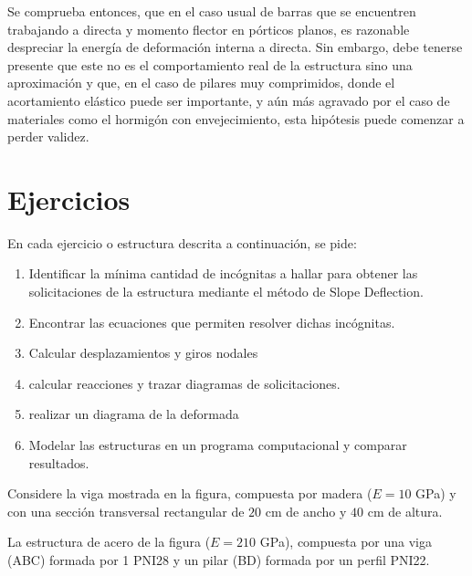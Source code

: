 Se comprueba entonces, que en el caso usual de barras que se encuentren trabajando a directa y momento flector en pórticos planos, es razonable despreciar la energía de deformación interna a directa. %
%
Sin embargo, debe tenerse presente que este no es el comportamiento real de la estructura sino una aproximación y que, en el caso de pilares muy comprimidos, donde el acortamiento elástico puede ser importante, y aún más agravado por el caso de materiales como el hormigón con envejecimiento, esta hipótesis puede comenzar a perder validez. 







\section{Ejercicios}
\setcounter{ejercicio}{0}

En cada ejercicio o estructura descrita a continuación, se pide:
%
\begin{enumerate}
  \item Identificar la mínima cantidad de incógnitas a hallar para obtener las solicitaciones de la estructura mediante el método de Slope Deflection.
  \item  Encontrar las ecuaciones que permiten resolver dichas incógnitas.
  \item  Calcular desplazamientos y giros nodales
  \item calcular reacciones y trazar diagramas de solicitaciones.
  \item realizar un diagrama de la deformada
  \item  Modelar las estructuras en un programa computacional y comparar resultados.
\end{enumerate}



\ejercicio

Considere la viga mostrada en la figura, compuesta por madera ($E=10$ GPa) y con una sección transversal rectangular de $20$ cm de ancho y $40$ cm de altura.

\begin{center}
	\def\svgwidth{0.8\textwidth}
	
\end{center}




\ejercicio

La estructura de acero de la figura ($E=210$ GPa), compuesta por una viga (ABC) formada por 1 PNI28 y un pilar (BD) formada por un perfil PNI22.

